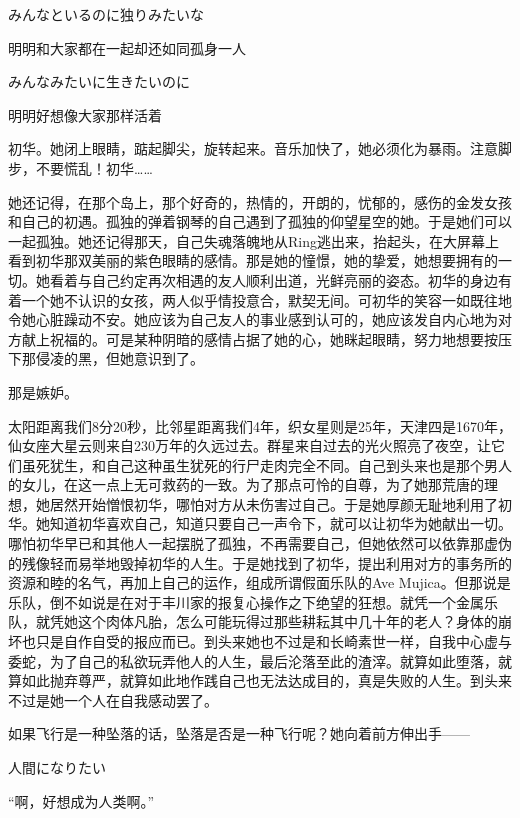\documentclass{article}
\begin{document}
みんなといるのに独りみたいな



明明和大家都在一起却还如同孤身一人



みんなみたいに生きたいのに



明明好想像大家那样活着



初华。她闭上眼睛，踮起脚尖，旋转起来。音乐加快了，她必须化为暴雨。注意脚步，不要慌乱！初华……



她还记得，在那个岛上，那个好奇的，热情的，开朗的，忧郁的，感伤的金发女孩和自己的初遇。孤独的弹着钢琴的自己遇到了孤独的仰望星空的她。于是她们可以一起孤独。她还记得那天，自己失魂落魄地从Ring逃出来，抬起头，在大屏幕上看到初华那双美丽的紫色眼睛的感情。那是她的憧憬，她的挚爱，她想要拥有的一切。她看着与自己约定再次相遇的友人顺利出道，光鲜亮丽的姿态。初华的身边有着一个她不认识的女孩，两人似乎情投意合，默契无间。可初华的笑容一如既往地令她心脏躁动不安。她应该为自己友人的事业感到认可的，她应该发自内心地为对方献上祝福的。可是某种阴暗的感情占据了她的心，她眯起眼睛，努力地想要按压下那侵凌的黑，但她意识到了。



那是嫉妒。



太阳距离我们8分20秒，比邻星距离我们4年，织女星则是25年，天津四是1670年，仙女座大星云则来自230万年的久远过去。群星来自过去的光火照亮了夜空，让它们虽死犹生，和自己这种虽生犹死的行尸走肉完全不同。自己到头来也是那个男人的女儿，在这一点上无可救药的一致。为了那点可怜的自尊，为了她那荒唐的理想，她居然开始憎恨初华，哪怕对方从未伤害过自己。于是她厚颜无耻地利用了初华。她知道初华喜欢自己，知道只要自己一声令下，就可以让初华为她献出一切。哪怕初华早已和其他人一起摆脱了孤独，不再需要自己，但她依然可以依靠那虚伪的残像轻而易举地毁掉初华的人生。于是她找到了初华，提出利用对方的事务所的资源和睦的名气，再加上自己的运作，组成所谓假面乐队的Ave Mujica。但那说是乐队，倒不如说是在对于丰川家的报复心操作之下绝望的狂想。就凭一个金属乐队，就凭她这个肉体凡胎，怎么可能玩得过那些耕耘其中几十年的老人？身体的崩坏也只是自作自受的报应而已。到头来她也不过是和长崎素世一样，自我中心虚与委蛇，为了自己的私欲玩弄他人的人生，最后沦落至此的渣滓。就算如此堕落，就算如此抛弃尊严，就算如此地作践自己也无法达成目的，真是失败的人生。到头来不过是她一个人在自我感动罢了。



如果飞行是一种坠落的话，坠落是否是一种飞行呢？她向着前方伸出手——



\newpage



人間になりたい



“啊，好想成为人类啊。”
\end{document}
